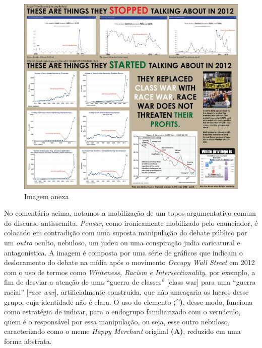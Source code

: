 \documentclass[portuguese]{textolivre}
\begin{document}
\begin{figure}[h!]
\centering
\begin{minipage}{.6\textwidth}
 \includegraphics[width=\textwidth]{image6.png}
 \caption{Imagem anexa}
 \label{fig6}
\end{minipage}
\end{figure}

No comentário acima, notamos a mobilização de um topos argumentativo comum do discurso antissemita. \emph{Pensar}, como ironicamente mobilizado pelo enunciador, é colocado em contradição com uma suposta manipulação do debate público por um \emph{outro} oculto, nebuloso, um judeu ou uma conspiração judia caricatural e antagonística. A imagem é composta por uma série de gráficos que indicam o deslocamento do debate na mídia após o movimento \emph{Occupy Wall Street} em 2012 com o uso de termos como \emph{Whiteness, Racism e Intersectionality}, por exemplo, a fim de desviar a atenção de uma “guerra de classes” [class war] para uma “guerra racial” [\emph{race war}], artificialmente construída, que não ameaçaria os lucros desse grupo, cuja identidade não é clara. O uso do elemento \textbf{;\textasciicircum{})}, desse modo, funciona como estratégia de indicar, para o endogrupo familiarizado com o vernáculo, quem é o responsável por essa manipulação, ou seja, esse outro nebuloso, caracterizado como o meme \emph{Happy Merchant} original \textbf{(A)}, reduzido em uma forma abstrata.
\end{document}
